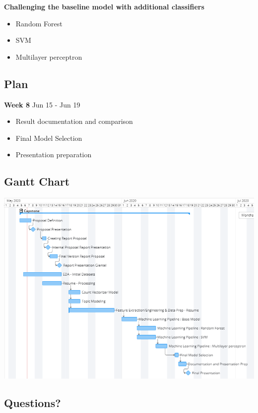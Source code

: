 \documentclass[
]{article}
\providecommand{\tightlist}{%
  \setlength{\itemsep}{0pt}\setlength{\parskip}{0pt}}
\begin{document}
\textbf{Challenging the baseline model with additional classifiers}

\begin{itemize}
\tightlist
\item
  Random Forest
\item
  SVM
\item
  Multilayer perceptron
\end{itemize}

\hypertarget{plan-5}{%
\subsection{Plan}\label{plan-5}}

\textbf{Week 8} Jun 15 - Jun 19

\begin{itemize}
\tightlist
\item
  Result documentation and comparison
\item
  Final Model Selection
\item
  Presentation preparation
\end{itemize}

\hypertarget{gantt-chart}{%
\subsection{Gantt Chart}\label{gantt-chart}}

\includegraphics[width=7.29167in,height=\textheight]{../img/project_proposal/22_gantt_chart.png}

\hypertarget{questions}{%
\subsection{Questions?}\label{questions}}
\end{document}
